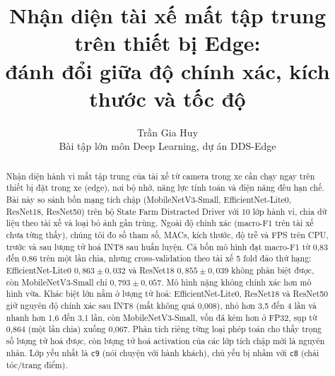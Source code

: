 \documentclass[10pt,a4paper,twocolumn]{article}
\title{\textbf{Nhận diện tài xế mất tập trung trên thiết bị Edge:\\
đánh đổi giữa độ chính xác, kích thước và tốc độ}}
\author{Trần Gia Huy\\[2pt]
\small Bài tập lớn môn Deep Learning, dự án DDS-Edge}
\date{}
\newcommand{\cls}[1]{\texttt{#1}}
\begin{document}
\maketitle

\begin{center}
\end{center}

\begin{abstract}
Nhận diện hành vi mất tập trung của tài xế từ camera trong xe cần chạy ngay trên thiết bị đặt trong xe (edge), nơi bộ nhớ, năng lực tính toán và điện năng đều hạn chế. Bài này so sánh bốn mạng tích chập (MobileNetV3-Small, EfficientNet-Lite0, ResNet18, ResNet50) trên bộ State Farm Distracted Driver với 10 lớp hành vi, chia dữ liệu theo tài xế và loại bỏ ảnh gần trùng. Ngoài độ chính xác (macro-F1 trên tài xế chưa từng thấy), chúng tôi đo số tham số, MACs, kích thước, độ trễ và FPS trên CPU, trước và sau lượng tử hoá INT8 sau huấn luyện. Cả bốn mô hình đạt macro-F1 từ 0,83 đến 0,86 trên một lần chia, nhưng cross-validation theo tài xế 5 fold đảo thứ hạng: EfficientNet-Lite0 $0{,}863 \pm 0{,}032$ và ResNet18 $0{,}855 \pm 0{,}039$ không phân biệt được, còn MobileNetV3-Small chỉ $0{,}793 \pm 0{,}057$. Mô hình nặng không chính xác hơn mô hình vừa. Khác biệt lớn nằm ở lượng tử hoá: EfficientNet-Lite0, ResNet18 và ResNet50 giữ nguyên độ chính xác sau INT8 (mất không quá 0,008), nhỏ hơn 3,5 đến 4 lần và nhanh hơn 1,6 đến 3,1 lần, còn MobileNetV3-Small, vốn đã kém hơn ở FP32, sụp từ 0,864 (một lần chia) xuống 0,067. Phân tích riêng từng loại phép toán cho thấy trọng số lượng tử hoá được, còn lượng tử hoá activation của các lớp tích chập mới là nguyên nhân. Lớp yếu nhất là \cls{c9} (nói chuyện với hành khách), chủ yếu bị nhầm với \cls{c8} (chải tóc/trang điểm).
\end{abstract}
\end{document}
